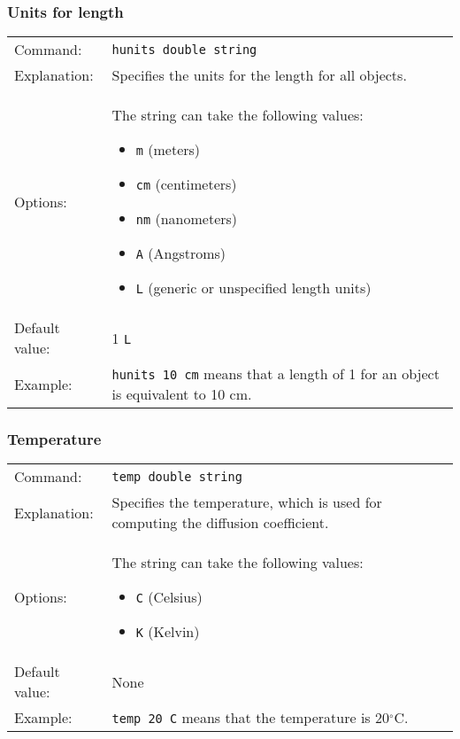 \documentclass[12pt,letterpaper]{article}
\begin{document}
\subsubsection{Units for length}
\begin{tabular}{p{1in} p{5.5in}}
Command: & \texttt{hunits double string} \\ 
Explanation: & Specifies the units for the length for all objects.\\
Options: & The string can take the following values: 
\begin{itemize}
\item \texttt{m} (meters)
\item \texttt{cm} (centimeters)
\item \texttt{nm} (nanometers)
\item \texttt{A} (Angstroms)
\item \texttt{L} (generic or unspecified length units)
\end{itemize} \\
Default value: & 1 \texttt{L} \\
Example: & \texttt{hunits 10 cm} means that a length of 1 for an object is equivalent to 10 cm.
\end{tabular}


\subsubsection{Temperature}
\begin{tabular}{p{1in} p{5.5in}}
Command: & \texttt{temp double string} \\ 
Explanation: & Specifies the temperature, which is used for computing the diffusion coefficient.\\
Options: & The string can take the following values:
\begin{itemize}
\item \texttt{C} (Celsius)
\item \texttt{K} (Kelvin)
\end{itemize} \\
Default value: & None \\
Example: & \texttt{temp 20 C} means that the temperature is 20$^\circ$C.
\end{tabular}
\end{document}
